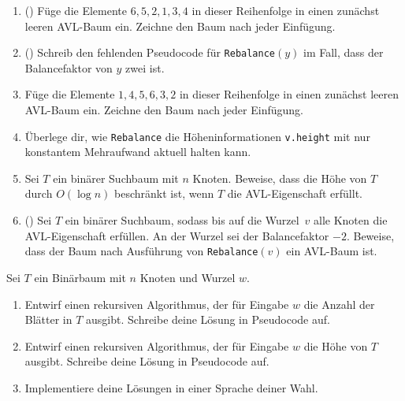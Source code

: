 \documentclass{uebung_cs}
\begin{document}
\begin{aufgabe}\mbox{}
	\begin{enumerate}
		\item(\warmup)
		Füge die Elemente $6, 5, 2, 1, 3, 4$ in dieser Reihenfolge in einen zunächst leeren AVL-Baum ein.
		Zeichne den Baum nach jeder Einfügung.
		\item(\warmup)
		Schreib den fehlenden Pseudocode für \texttt{Rebalance}$(y)$ im Fall, dass der Balancefaktor von $y$ zwei ist.
		\item
		Füge die Elemente $1, 4, 5, 6, 3, 2$ in dieser Reihenfolge in einen zunächst leeren AVL-Baum ein.
		Zeichne den Baum nach jeder Einfügung.
		\item Überlege dir, wie \texttt{Rebalance} die Höheninformationen \texttt{v.height} mit nur konstantem Mehraufwand aktuell halten kann.
		\item Sei $T$ ein binärer Suchbaum mit $n$ Knoten.
		Beweise, dass die Höhe von $T$ durch $O(\log n)$ beschränkt ist, wenn $T$ die AVL-Eigenschaft erfüllt.
		\item(\hard) Sei $T$ ein binärer Suchbaum, sodass bis auf die Wurzel~$v$ alle Knoten die AVL-Eigenschaft erfüllen. An der Wurzel sei der Balancefaktor $-2$. Beweise, dass der Baum nach Ausführung von \texttt{Rebalance}$(v)$ ein AVL-Baum ist.
	\end{enumerate}
\end{aufgabe}

\begin{aufgabe}
	Sei $T$ ein Binärbaum mit $n$ Knoten und Wurzel $w$.
	\begin{enumerate}
		\item Entwirf einen rekursiven Algorithmus, der für Eingabe $w$ die Anzahl der Blätter in $T$ ausgibt.
		Schreibe deine Lösung in Pseudocode auf.
		\item Entwirf einen rekursiven Algorithmus, der für Eingabe $w$ die Höhe von $T$ ausgibt.
		Schreibe deine Lösung in Pseudocode auf.
		\item Implementiere deine Lösungen in einer Sprache deiner Wahl.
	\end{enumerate}
\end{aufgabe}
\end{document}
